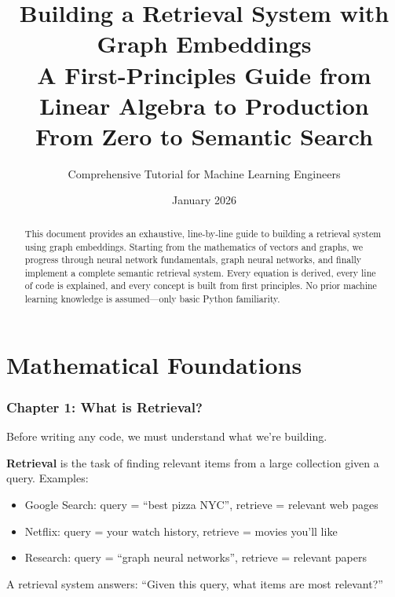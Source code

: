\documentclass[12pt,a4paper]{article}
\title{\Huge\textbf{Building a Retrieval System with Graph Embeddings}\\[0.5cm]
\Large A First-Principles Guide from Linear Algebra to Production\\[0.3cm]
\normalsize From Zero to Semantic Search}
\author{Comprehensive Tutorial for Machine Learning Engineers}
\date{January 2026}
\begin{document}
\maketitle
\thispagestyle{empty}

\vspace{1cm}

\begin{abstract}
This document provides an exhaustive, line-by-line guide to building a retrieval system using graph embeddings. Starting from the mathematics of vectors and graphs, we progress through neural network fundamentals, graph neural networks, and finally implement a complete semantic retrieval system. Every equation is derived, every line of code is explained, and every concept is built from first principles. No prior machine learning knowledge is assumed---only basic Python familiarity.
\end{abstract}

\newpage
\tableofcontents
\newpage

\part{Mathematical Foundations}

\section{Chapter 1: What is Retrieval?}

Before writing any code, we must understand what we're building.

\begin{concept}
\textbf{Retrieval} is the task of finding relevant items from a large collection given a query. Examples:
\begin{itemize}
    \item Google Search: query = ``best pizza NYC'', retrieve = relevant web pages
    \item Netflix: query = your watch history, retrieve = movies you'll like
    \item Research: query = ``graph neural networks'', retrieve = relevant papers
\end{itemize}
A retrieval system answers: ``Given this query, what items are most relevant?''
\end{concept}
\end{document}
